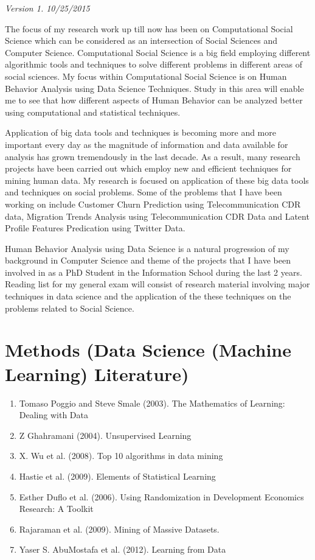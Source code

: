 \textit{Version 1. 10/25/2015} 

The focus of my research work up till now has been on Computational Social Science which can be considered as an intersection of Social Sciences and Computer Science. Computational Social Science is a big field employing different algorithmic tools and techniques to solve different problems in different areas of social sciences. My focus within Computational Social Science is on Human Behavior Analysis using Data Science Techniques. Study in this area will enable me to see that how different aspects of Human Behavior can be analyzed better using computational and statistical techniques.

Application of big data tools and techniques is becoming more and more important every day as the magnitude of information and data available for analysis has grown tremendously in the last decade. As a result, many research projects have been carried out which employ new and efficient techniques for mining human data. My research is focused on application of these big data tools and techniques on social problems. Some of the problems that I have been working on include Customer Churn Prediction using Telecommunication CDR data, Migration Trends Analysis using Telecommunication CDR Data  and Latent Profile Features Predication using Twitter Data.

Human Behavior Analysis using Data Science is a natural progression of my background in Computer Science and theme of the projects that I have been involved in as a PhD Student in the Information School during the last 2 years. 
Reading list for my general exam will consist of research material involving major techniques in data science and the application of the these techniques on the problems related to Social Science. 

\section{Methods (Data Science (Machine Learning) Literature)}
\begin{enumerate}
\item Tomaso Poggio and Steve Smale (2003). The Mathematics of Learning: Dealing with Data\cite{Poggio_2005}
\item Z Ghahramani (2004). Unsupervised Learning \cite{Ghahramani_2004}
\item X. Wu et al. (2008). Top 10 algorithms in data mining \cite{2009}
\item Hastie et al. (2009). Elements of Statistical Learning \cite{StatisticalLearning_2009}
\item Esther Duflo et al. (2006). Using Randomization in Development Economics Research: A Toolkit \cite{Duflo} 
\item Rajaraman et al. (2009). Mining of Massive Datasets. \cite{Rajaraman_2009}
\item Yaser S. AbuMostafa et al. (2012). Learning from Data \cite{Abu-Mostafa:2012:LD:2207825}
\end{enumerate}

